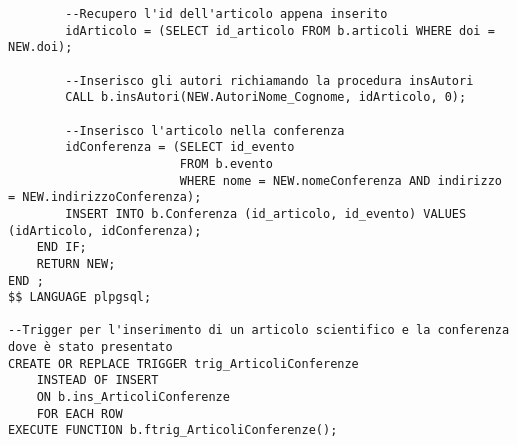 \begin{lstlisting}
        --Recupero l'id dell'articolo appena inserito
        idArticolo = (SELECT id_articolo FROM b.articoli WHERE doi = NEW.doi);

        --Inserisco gli autori richiamando la procedura insAutori
        CALL b.insAutori(NEW.AutoriNome_Cognome, idArticolo, 0);

        --Inserisco l'articolo nella conferenza
        idConferenza = (SELECT id_evento
                        FROM b.evento
                        WHERE nome = NEW.nomeConferenza AND indirizzo = NEW.indirizzoConferenza);
        INSERT INTO b.Conferenza (id_articolo, id_evento) VALUES (idArticolo, idConferenza);
    END IF;
    RETURN NEW;
END ;
$$ LANGUAGE plpgsql;

--Trigger per l'inserimento di un articolo scientifico e la conferenza dove è stato presentato
CREATE OR REPLACE TRIGGER trig_ArticoliConferenze
    INSTEAD OF INSERT
    ON b.ins_ArticoliConferenze
    FOR EACH ROW
EXECUTE FUNCTION b.ftrig_ArticoliConferenze();
\end{lstlisting}


